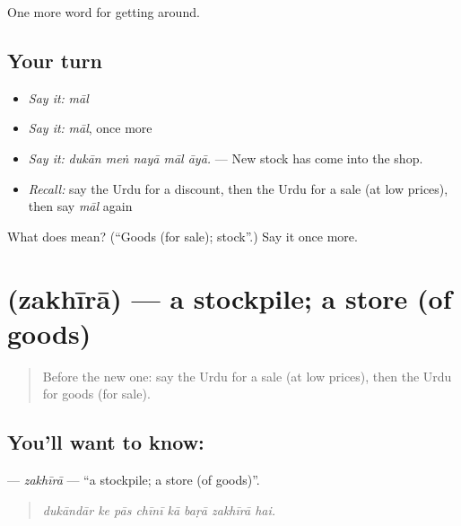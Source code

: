 \begin{grammarlens}[title={What you've built}]
One more word for getting around.
\end{grammarlens}

\subsection*{Your turn}
\begin{itemize}
\raggedright
  \item \emph{Say it:} \emph{māl}
  \item \emph{Say it:} \emph{māl}, once more
  \item \emph{Say it:} \emph{dukān meṅ nayā māl āyā.} — New stock has come into the shop.
  \item \emph{Recall:} say the Urdu for a discount, then the Urdu for a sale (at low prices), then say \emph{māl} again
\end{itemize}

\begin{tcolorbox}[breakable,colback=teal!4,colframe=teal!35!black,title={Before you move on}]
What does  mean? (\textquotedblleft{}Goods (for sale); stock\textquotedblright{}.) Say it once more.
\end{tcolorbox}
\section[\texorpdfstring{\ur{ذخیرہ} (zakhīrā)}{ذخیرہ (zakhīrā)}]{ (zakhīrā) — a stockpile; a store (of goods)}

\label{lesson:UR-C424-zakhira}



\begin{quote}
Before the new one: say the Urdu for a sale (at low prices), then the Urdu for goods (for sale).
\end{quote}

\subsection*{You'll want to know: }
\textbf{} — \emph{zakhīrā} — \textquotedblleft{}a stockpile; a store (of goods)\textquotedblright{}.

\begin{quote}
       
\end{quote}

\begin{quote}
\emph{dukāndār ke pās chīnī kā baṛā zakhīrā hai.}
\end{quote}

